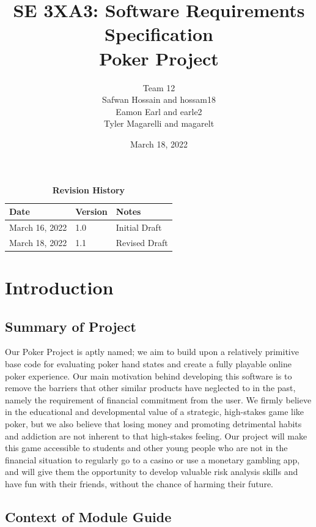 \documentclass[12pt, titlepage]{article}
\title{SE 3XA3: Software Requirements Specification\\Poker Project}
\author{Team 12
        \\ Safwan Hossain and hossam18
        \\ Eamon Earl and earle2
        \\ Tyler Magarelli and magarelt
}
\date{March 18, 2022}
\begin{document}
\maketitle

\tableofcontents
\listoftables
\listoffigures

\begin{table}[bp]
\caption{\bf Revision History}
\begin{tabularx}{\textwidth}{p{3cm}p{2cm}X}
\toprule {\bf Date} & {\bf Version} & {\bf Notes}\\
\midrule
March 16, 2022 & 1.0 & Initial Draft\\
March 18, 2022 & 1.1 & Revised Draft\\
\bottomrule
\end{tabularx}
\end{table}

\newpage


\section{Introduction}

\subsection{Summary of Project}

Our Poker Project is aptly named; we aim to build upon a relatively primitive base code for evaluating poker hand states and create a fully playable online poker experience. Our main motivation behind developing this software is to remove the barriers that other similar products have neglected to in the past, namely the requirement of financial commitment from the user. We firmly believe in the educational and developmental value of a strategic, high-stakes game like poker, but we also believe that losing money and promoting detrimental habits and addiction are not inherent to that high-stakes feeling. Our project will make this game accessible to students and other young people who are not in the financial situation to regularly go to a casino or use a monetary gambling app, and will give them the opportunity to develop valuable risk analysis skills and have fun with their friends, without the chance of harming their future. 

\subsection{Context of Module Guide}
\end{document}
